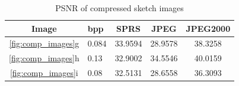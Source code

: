 

\begin{table}[H]
\centering
\begin{tabular}{| c l | c | c | c|}
\hline\hline
Image & bpp & SPRS & JPEG & JPEG2000 \\
\hline
\ref{fig:comp_images}g & 0.084 & 33.9594 & 28.9578 & 38.3258  \\
\hline
\ref{fig:comp_images}h & 0.13 & 32.9002 & 34.5546 &  40.0159 \\
\hline
\ref{fig:comp_images}i & 0.08 & 32.5131 & 28.6558 & 36.3093  \\
\hline
\end{tabular}
\caption{PSNR of compressed sketch images}
\label{tab:compression2}
\end{table}
